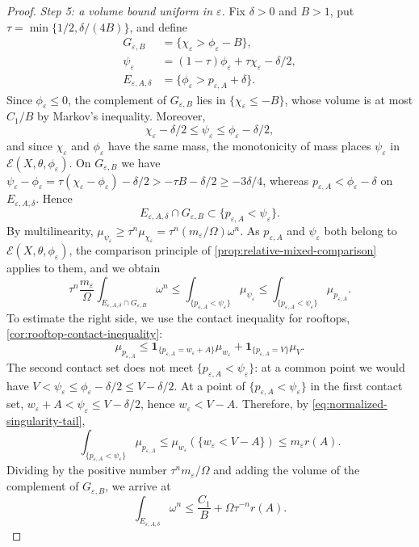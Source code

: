 \begin{proof}
\emph{Step 5: a volume bound uniform in $\varepsilon$.} Fix $\delta>0$ and $B>1$, put $\tau=\min\{1/2,\delta/(4B)\}$, and define
\[
 \begin{aligned}
  G_{\varepsilon,B}&=\{\chi_\varepsilon>\phi_\varepsilon-B\},\\
  \psi_\varepsilon&=(1-\tau)\phi_\varepsilon
                       +\tau\chi_\varepsilon-\delta/2,\\
  E_{\varepsilon,A,\delta}&=\{\phi_\varepsilon>p_{\varepsilon,A}+\delta\}.
 \end{aligned}
\]
Since $\phi_\varepsilon\leq0$, the complement of $G_{\varepsilon,B}$ lies in $\{\chi_\varepsilon\leq-B\}$, whose volume is at most $C_1/B$ by Markov's inequality. Moreover,
\[
 \chi_\varepsilon-\delta/2\leq\psi_\varepsilon
                      \leq\phi_\varepsilon-\delta/2,
\]
and since $\chi_\varepsilon$ and $\phi_\varepsilon$ have the same mass, the monotonicity of mass places $\psi_\varepsilon$ in $\mathcal E(X,\theta,\phi_\varepsilon)$. On $G_{\varepsilon,B}$ we have $\psi_\varepsilon-\phi_\varepsilon=\tau(\chi_\varepsilon-\phi_\varepsilon)-\delta/2>-\tau B-\delta/2\geq-3\delta/4$, whereas $p_{\varepsilon,A}<\phi_\varepsilon-\delta$ on $E_{\varepsilon,A,\delta}$. Hence
\[
 E_{\varepsilon,A,\delta}\cap G_{\varepsilon,B}\subset\{p_{\varepsilon,A}<\psi_\varepsilon\}.
\]
By multilinearity, $\mu_{\psi_\varepsilon}\geq\tau^n\mu_{\chi_\varepsilon}=\tau^n(m_\varepsilon/\Omega)\omega^n$. As $p_{\varepsilon,A}$ and $\psi_\varepsilon$ both belong to $\mathcal E(X,\theta,\phi_\varepsilon)$, the comparison principle of \cref{prop:relative-mixed-comparison} applies to them, and we obtain
\[
 \tau^n\frac{m_\varepsilon}{\Omega}
       \int_{E_{\varepsilon,A,\delta}\cap G_{\varepsilon,B}}\omega^n
 \leq\int_{\{p_{\varepsilon,A}<\psi_\varepsilon\}}\mu_{\psi_\varepsilon}
 \leq\int_{\{p_{\varepsilon,A}<\psi_\varepsilon\}}\mu_{p_{\varepsilon,A}}.
\]
To estimate the right side, we use the contact inequality for rooftops, \cref{cor:rooftop-contact-inequality}:
\[
 \mu_{p_{\varepsilon,A}}
 \leq\mathbf1_{\{p_{\varepsilon,A}=w_\varepsilon+A\}}\mu_{w_\varepsilon}
       +\mathbf1_{\{p_{\varepsilon,A}=V\}}\mu_V.
\]
The second contact set does not meet $\{p_{\varepsilon,A}<\psi_\varepsilon\}$: at a common point we would have $V<\psi_\varepsilon\leq\phi_\varepsilon-\delta/2\leq V-\delta/2$. At a point of $\{p_{\varepsilon,A}<\psi_\varepsilon\}$ in the first contact set, $w_\varepsilon+A<\psi_\varepsilon\leq V-\delta/2$, hence $w_\varepsilon<V-A$. Therefore, by \eqref{eq:normalized-singularity-tail},
\[
 \int_{\{p_{\varepsilon,A}<\psi_\varepsilon\}}\mu_{p_{\varepsilon,A}}
 \leq\mu_{w_\varepsilon}(\{w_\varepsilon<V-A\})\leq m_\varepsilon r(A).
\]
Dividing by the positive number $\tau^nm_\varepsilon/\Omega$ and adding the volume of the complement of $G_{\varepsilon,B}$, we arrive at
\begin{equation}\label{eq:ceiling-volume-recovery}
 \int_{E_{\varepsilon,A,\delta}}\omega^n
       \leq\frac{C_1}{B}+\Omega\tau^{-n}r(A).
\end{equation}


\end{proof}
